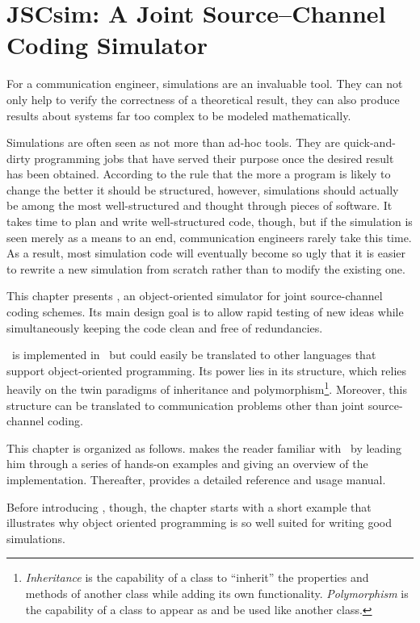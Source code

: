 \chapter{JSCsim: A Joint Source--Channel Coding Simulator}
\label{ch:simulator}
\label{ch:mindelbwex}

For a communication engineer, simulations are an invaluable tool. They can not
only help to verify the correctness of a theoretical result, they can also
 produce results about systems far too complex to be modeled mathematically.

Simulations are often seen as not more than ad-hoc tools. They are
quick-and-dirty programming jobs that have served their purpose once the desired
result has been obtained. According to the rule that the more a program is
likely to change the better it should be structured, however, simulations should
actually be among the most well-structured and thought through pieces of
software. It takes time to plan and write well-structured code, though, but
if the simulation is seen merely as a means to an end, communication engineers
rarely take this time.  As a result, most simulation code will eventually become
so ugly that it is easier to rewrite a new simulation from scratch rather than
to modify the existing one. 

This chapter presents \jscsim, an object-oriented simulator for joint
source-channel coding schemes. Its main design goal is to allow rapid testing
of new ideas while simultaneously keeping the code clean and free of
redundancies. 

\jscsim\ is implemented in \matlab\ but could easily be translated to other
languages that support object-oriented programming. Its power lies in its
structure, which relies heavily on the twin paradigms of inheritance and
polymorphism\footnote{\emph{Inheritance} is the capability of a class to
``inherit'' the properties and methods of another class while adding its own
functionality. \emph{Polymorphism} is the capability of a class to appear as and
be used like another class.}. Moreover, this structure can be translated to
communication problems other than joint source-channel coding. 

This chapter is organized as follows.  makes the reader
familiar with \jscsim\ by leading him through a series of hands-on examples and
giving an overview of the implementation.  Thereafter, 
provides a detailed reference and usage manual.  

Before introducing \jscsim, though, the chapter starts with a short example that
illustrates why object oriented programming is so well suited for writing
good simulations.

